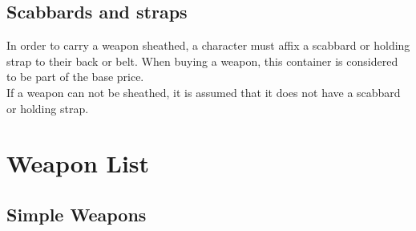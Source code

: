 \subsection{Scabbards and straps}\label{subsec:scabbards}
In order to carry a weapon sheathed, a character must affix a scabbard or holding strap to their back or belt.
When buying a weapon, this container is considered to be part of the base price.\\
If a weapon can not be sheathed, it is assumed that it does not have a scabbard or holding strap.

\section{Weapon List}\label{sec:weaponList}
\subsection{Simple Weapons}\label{subsec:simpleWeapons}
































